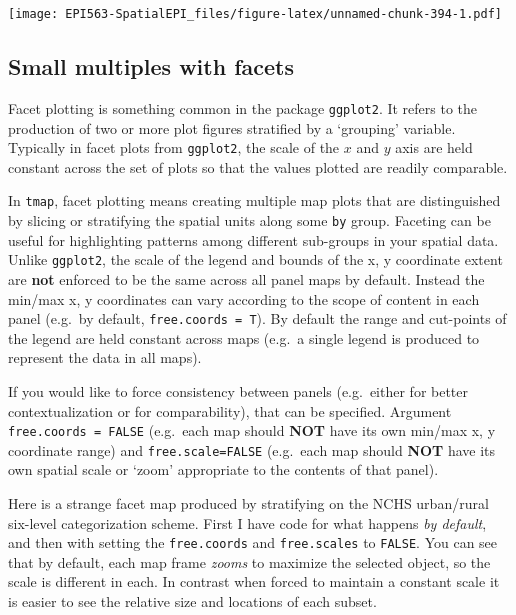 \documentclass[
]{book}
\newcommand{\passthrough}[1]{#1}
\begin{document}
\texttt{[image: EPI563-SpatialEPI\_files/figure-latex/unnamed-chunk-394-1.pdf]}

\hypertarget{tmap-facet}{%
\subsection{Small multiples with facets}\label{tmap-facet}}

Facet plotting is something common in the package \passthrough{\lstinline!ggplot2!}. It refers to the production of two or more plot figures stratified by a `grouping' variable. Typically in facet plots from \passthrough{\lstinline!ggplot2!}, the scale of the \(x\) and \(y\) axis are held constant across the set of plots so that the values plotted are readily comparable.

In \passthrough{\lstinline!tmap!}, facet plotting means creating multiple map plots that are distinguished by slicing or stratifying the spatial units along some \passthrough{\lstinline!by!} group. Faceting can be useful for highlighting patterns among different sub-groups in your spatial data. Unlike \passthrough{\lstinline!ggplot2!}, the scale of the legend and bounds of the x, y coordinate extent are \textbf{not} enforced to be the same across all panel maps by default. Instead the min/max x, y coordinates can vary according to the scope of content in each panel (e.g.~by default, \passthrough{\lstinline!free.coords = T!}). By default the range and cut-points of the legend are held constant across maps (e.g.~a single legend is produced to represent the data in all maps).

If you would like to force consistency between panels (e.g.~either for better contextualization or for comparability), that can be specified. Argument \passthrough{\lstinline!free.coords = FALSE!} (e.g.~each map should \textbf{NOT} have its own min/max x, y coordinate range) and \passthrough{\lstinline!free.scale=FALSE!} (e.g.~each map should \textbf{NOT} have its own spatial scale or `zoom' appropriate to the contents of that panel).

Here is a strange facet map produced by stratifying on the NCHS urban/rural six-level categorization scheme. First I have code for what happens \emph{by default}, and then with setting the \passthrough{\lstinline!free.coords!} and \passthrough{\lstinline!free.scales!} to \passthrough{\lstinline!FALSE!}. You can see that by default, each map frame \emph{zooms} to maximize the selected object, so the scale is different in each. In contrast when forced to maintain a constant scale it is easier to see the relative size and locations of each subset.
\end{document}
